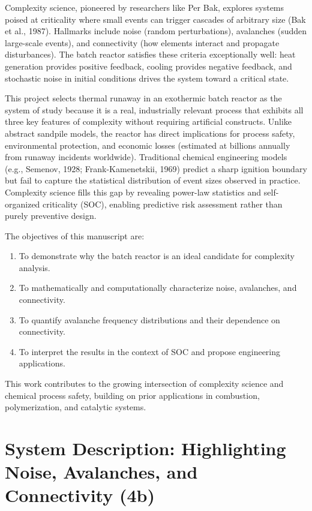 \documentclass[11pt,a4paper]{article}
\begin{document}
Complexity science, pioneered by researchers like Per Bak, explores systems poised at criticality where small events can trigger cascades of arbitrary size (Bak et al., 1987). Hallmarks include noise (random perturbations), avalanches (sudden large-scale events), and connectivity (how elements interact and propagate disturbances). The batch reactor satisfies these criteria exceptionally well: heat generation provides positive feedback, cooling provides negative feedback, and stochastic noise in initial conditions drives the system toward a critical state.

This project selects thermal runaway in an exothermic batch reactor as the system of study because it is a real, industrially relevant process that exhibits all three key features of complexity without requiring artificial constructs. Unlike abstract sandpile models, the reactor has direct implications for process safety, environmental protection, and economic losses (estimated at billions annually from runaway incidents worldwide). Traditional chemical engineering models (e.g., Semenov, 1928; Frank-Kamenetskii, 1969) predict a sharp ignition boundary but fail to capture the statistical distribution of event sizes observed in practice. Complexity science fills this gap by revealing power-law statistics and self-organized criticality (SOC), enabling predictive risk assessment rather than purely preventive design.

The objectives of this manuscript are:
\begin{enumerate}
\item To demonstrate why the batch reactor is an ideal candidate for complexity analysis.
\item To mathematically and computationally characterize noise, avalanches, and connectivity.
\item To quantify avalanche frequency distributions and their dependence on connectivity.
\item To interpret the results in the context of SOC and propose engineering applications.
\end{enumerate}

This work contributes to the growing intersection of complexity science and chemical process safety, building on prior applications in combustion, polymerization, and catalytic systems.

\section{System Description: Highlighting Noise, Avalanches, and Connectivity (4b)}
\label{sec:system}
\end{document}
